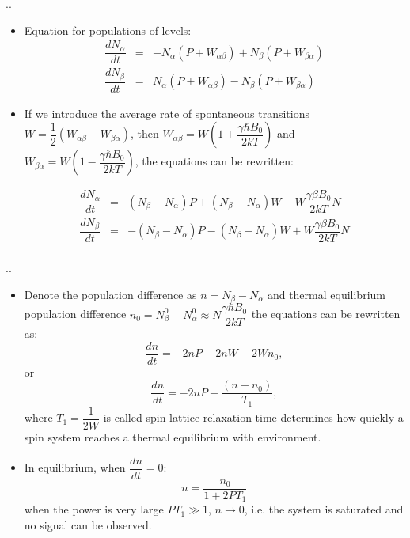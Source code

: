 \documentclass[handout]{beamer}
\begin{document}
\begin{frame}{\thesection.\thesubsection. \insertsubsection}
	\begin{itemize}[<+>]
		\item Equation for populations of levels:
		\begin{equation}
		\begin{array}{lcl}
		\dfrac{dN_{\alpha}}{dt} &=& -N_{\alpha}(P + W_{\alpha \beta}) + N_{\beta}(P+W_{\beta \alpha})  \\
		\dfrac{dN_{\beta}}{dt} &=&  N_{\alpha}(P + W_{\alpha \beta}) - N_{\beta}(P+W_{\beta \alpha})  
		\end{array}
		\end{equation}
		\item 
		If we introduce the average rate of spontaneous transitions $W = \dfrac{1}{2}(W_{\alpha \beta} - W_{\beta \alpha})$, then $W_{\alpha \beta} = W(1 + \dfrac{\gamma \hbar B_0}{2kT})$ and $W_{ \beta \alpha} = W(1 - \dfrac{\gamma \hbar B_0}{2kT})$, the equations can be rewritten:
		
		\begin{equation}
		\begin{array}{lcl}
		\dfrac{dN_{\alpha}}{dt} &=& (N_{\beta} - N_{\alpha})P + (N_{\beta} - N_{\alpha})W - W\dfrac{\gamma \beta B_0}{2kT}N \\
		\dfrac{dN_{\beta}}{dt} &=& -(N_{\beta} - N_{\alpha})P - (N_{\beta} - N_{\alpha})W + W\dfrac{\gamma \beta B_0}{2kT}N \\
		\end{array}
		\end{equation}		
	\end{itemize}
\end{frame}

\begin{frame}{\thesection.\thesubsection. \insertsubsection}
	\begin{itemize}[<+>]
		\item Denote the population difference as $n = N_{\beta} - N_{\alpha}$ and thermal equilibrium population difference $n_0 = N_{\beta}^0 - N_{\alpha}^0 \approx N\dfrac{\gamma \hbar B_0}{2kT}$ the equations can be rewritten as:
		\begin{equation}
		   \dfrac{dn}{dt} = - 2 n P - 2 n W + 2W n_0,
		\end{equation}
		or
		\begin{equation}
		    \dfrac{dn}{dt} = - 2 n P -\dfrac{ (n - n_0)}{T_1},
		\end{equation}
		where $T_1 = \dfrac{1}{2W}$ is called \alert{spin-lattice relaxation time} determines how quickly a spin system reaches a thermal equilibrium with environment.
		\item In equilibrium, when $\dfrac{dn}{dt} = 0$:
		\begin{equation}
			n = \dfrac{n_0}{1 + 2 P T_1}
		\end{equation}
		when the power is very large $PT_1 \gg 1$, $n \rightarrow 0$, i.e. the system is \alert{saturated} and no signal can be observed.
			
	\end{itemize}
\end{frame}
\end{document}
